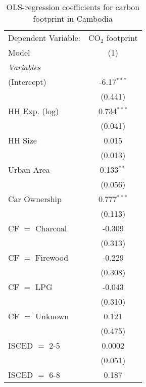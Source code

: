 
\begin{table}[htbp!]
   \centering
   \small
   \begin{adjustbox}{width = 1\textwidth, max height = 0.95\textheight, center}
      \begin{threeparttable}[b]
         \caption{\label{tab:OLS_2_KHM} OLS-regression coefficients for carbon footprint in Cambodia}
         \begin{tabular}{lc}
            \tabularnewline \midrule \midrule
            Dependent Variable: & CO$_{2}$ footprint\\  
            Model               & (1)\\  
            \midrule
            \emph{Variables}\\
            (Intercept)         & -6.17$^{***}$\\   
                                & (0.441)\\   
            HH Exp. (log)       & 0.734$^{***}$\\   
                                & (0.041)\\   
            HH Size             & 0.015\\   
                                & (0.013)\\   
            Urban Area          & 0.133$^{**}$\\   
                                & (0.056)\\   
            Car Ownership       & 0.777$^{***}$\\   
                                & (0.113)\\   
            CF $=$ Charcoal     & -0.309\\   
                                & (0.313)\\   
            CF $=$ Firewood     & -0.229\\   
                                & (0.308)\\   
            CF $=$ LPG          & -0.043\\   
                                & (0.310)\\   
            CF $=$ Unknown      & 0.121\\   
                                & (0.475)\\   
            ISCED $=$ 2-5       & 0.0002\\   
                                & (0.051)\\   
            ISCED $=$ 6-8       & 0.187\\   

\end{tabular}
\end{threeparttable}
\end{adjustbox}
\end{table}
